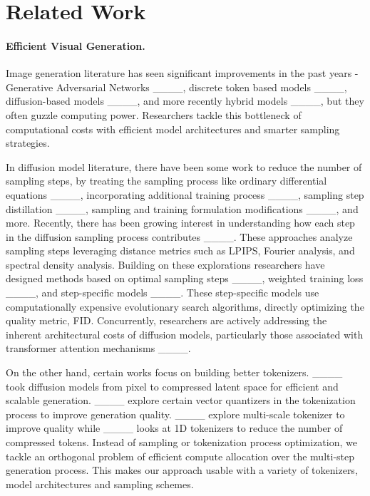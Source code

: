\section{Related Work}
\paragraph{Efficient Visual Generation.}
Image generation literature has seen significant improvements in the past years - Generative Adversarial Networks ____, discrete token based models ____, diffusion-based models ____, and more recently hybrid models ____, but they often guzzle computing power. Researchers tackle this bottleneck of computational costs with efficient model architectures and smarter sampling strategies. 


In  diffusion model literature, there have been some work to reduce the number of sampling steps, by treating the sampling process like ordinary differential equations ____, incorporating additional training process ____, sampling step distillation ____, sampling and training formulation modifications ____, and more. 
Recently, there has been growing interest in understanding how each step in the diffusion sampling process contributes ____. %
These approaches analyze sampling steps leveraging distance metrics such as LPIPS, Fourier analysis, and spectral density analysis.
Building on these explorations researchers have designed methods based on optimal sampling steps ____, weighted training loss ____, and step-specific models ____. These step-specific models use computationally expensive evolutionary search algorithms, directly optimizing the quality metric, FID. Concurrently, researchers are actively addressing the inherent architectural costs of diffusion models, particularly those associated with transformer attention mechanisms ____.
 
On the other hand, certain works focus on building better tokenizers. ____ took diffusion models from pixel to compressed latent space for efficient and scalable generation.  ____ explore certain vector quantizers in the tokenization process to improve generation quality. ____ explore multi-scale tokenizer to improve quality while ____ looks at 1D tokenizers to reduce the number of compressed tokens. Instead of sampling or tokenization process optimization, we tackle an orthogonal problem of efficient compute allocation over the multi-step generation process. This makes our approach usable with a variety of tokenizers, model architectures and sampling schemes.

